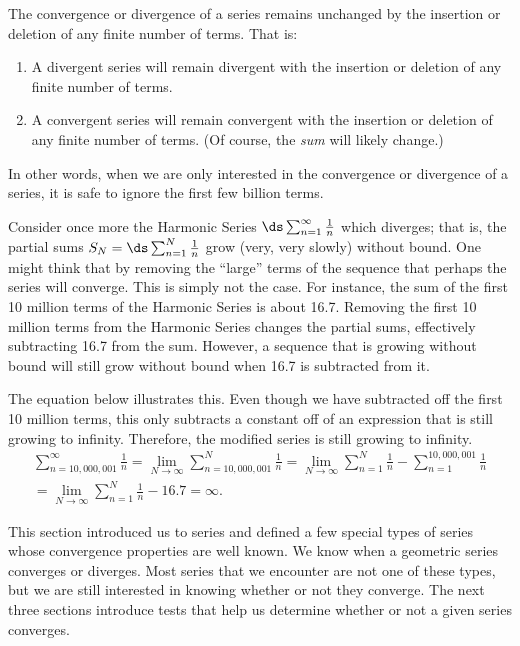\begin{theorem}\label{thm:series_behavior}
The convergence or divergence of a series remains unchanged by the insertion or deletion of any finite number of terms. That is:
\begin{enumerate}
	\item	A divergent series will remain divergent with the insertion or deletion of any finite number of terms.
	\item	A convergent series will remain convergent with the insertion or deletion of any finite number of terms. (Of course, the \emph{sum} will likely change.)
\end{enumerate}
\end{theorem}

In other words, when we are only interested in the convergence or divergence of a series, it is safe to ignore the first few billion terms.

\begin{example}\label{ex_trunc_harm}
Consider once more the Harmonic Series $\ds\sum_{n=1}^\infty\frac1n$\vspace{-.8\baselineskip} which diverges; that is, the partial sums $S_N=\ds\sum_{n=1}^N\frac1n$ grow (very, very slowly) without bound. One might think that by removing the ``large'' terms of the sequence that perhaps the series will converge. This is simply not the case. For instance, the sum of the first 10 million terms of the Harmonic Series is about 16.7. Removing the first 10 million terms from the Harmonic Series changes the partial sums,  effectively subtracting 16.7 from the sum. However, a sequence that is growing without bound will still grow without bound when 16.7 is subtracted from it. 

The equation below illustrates this. Even though we have subtracted off the first 10 million terms, this only subtracts a constant off of an expression that is still growing to infinity. Therefore, the modified series is still growing to infinity.
\begin{multline*}
 \sum_{n=10,000,001}^\infty\frac1n
 =\lim_{N\to\infty}\sum_{n=10,000,001}^N\frac1n
 =\lim_{N\to\infty}\sum_{n=1}^N\frac1n-\sum_{n=1}^{10,000,001}\frac1n \\
 =\lim_{N\to\infty}\sum_{n=1}^N\frac1n-16.7
 =\infty.
\end{multline*}
\end{example}

This section introduced us to series and defined a few special types of series whose convergence properties are well known. We know when a geometric series converges or diverges. Most series that we encounter are not one of these types, but we are still interested in knowing whether or not they converge. The next three sections introduce tests that help us determine whether or not a given series converges.

